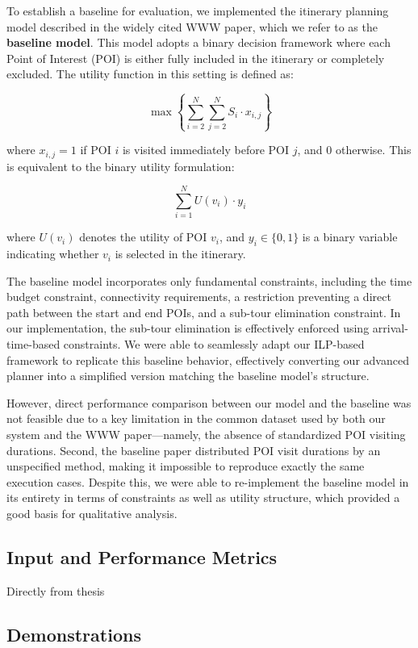 \documentclass[sigconf,authordraft]{acmart}
\begin{document}
To establish a baseline for evaluation, we implemented the itinerary planning model described in the widely cited WWW paper, which we refer to as the \textbf{baseline model}. This model adopts a binary decision framework where each Point of Interest (POI) is either fully included in the itinerary or completely excluded. The utility function in this setting is defined as:

\[
\max \left\{ \sum_{i=2}^{N} \sum_{j=2}^{N} S_i \cdot x_{i,j} \right\}
\]

where \( x_{i,j} = 1 \) if POI \( i \) is visited immediately before POI \( j \), and 0 otherwise. This is equivalent to the binary utility formulation:

\[
\sum_{i=1}^{N} U(v_i) \cdot y_i
\]

where \( U(v_i) \) denotes the utility of POI \( v_i \), and \( y_i \in \{0,1\} \) is a binary variable indicating whether \( v_i \) is selected in the itinerary.

The baseline model incorporates only fundamental constraints, including the time budget constraint, connectivity requirements, a restriction preventing a direct path between the start and end POIs, and a sub-tour elimination constraint. In our implementation, the sub-tour elimination is effectively enforced using arrival-time-based constraints. We were able to seamlessly adapt our ILP-based framework to replicate this baseline behavior, effectively converting our advanced planner into a simplified version matching the baseline model's structure.

However, direct performance comparison between our model and the baseline was not feasible due to a key limitation in the common dataset used by both our system and the WWW paper---namely, the absence of standardized POI visiting durations. Second, the baseline paper distributed POI visit durations by an unspecified method, making it impossible to reproduce exactly the same execution cases. Despite this, we were able to re-implement the baseline model in its entirety in terms of constraints as well as utility structure, which provided a good basis for qualitative analysis.

\subsection{Input and Performance Metrics}

Directly from thesis

\subsection{Demonstrations}
\end{document}
